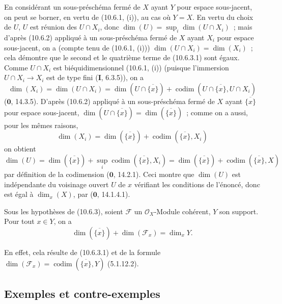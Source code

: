 En considérant un sous-préschéma fermé de $X$ ayant $Y$ pour espace sous-jacent,
on peut se borner, en vertu de (10.6.1, (i)), au cas où $Y=X$. En vertu du choix
de $U$, $U$ est réunion des $U\cap X_i$, donc
$\dim(U)=\sup_i\dim(U\cap X_i)$~; mais d'après (10.6.2) appliqué à un
sous-préschéma fermé de $X$ ayant $X_i$ pour espace sous-jacent, on a (compte
tenu de (10.6.1, (i))) $\dim(U\cap X_i)=\dim(X_i)$~; cela démontre que le second
et le quatrième terme de (10.6.3.1) sont égaux. Comme $U\cap X_i$ est
biéquidimensionnel (10.6.1, (i)) (puisque l'immersion $U\cap X_i\to X_i$ est de
type fini (\textbf{I}, 6.3.5)), on a
\begin{equation}
\label{IV.10.6.3.2-fr}
\tag{10.6.3.2}
\dim(X_i)=\dim(U\cap X_i)=\dim(U\cap\overline{\{x\}})
 +\operatorname{codim}(U\cap\overline{\{x\}},U\cap X_i)
\end{equation}
($\mathbf 0$, 14.3.5). D'après (10.6.2) appliqué à un sous-préschéma fermé de
$X$ ayant $\overline{\{x\}}$ pour espace sous-jacent,
$\dim(U\cap\overline{\{x\}})=\dim(\overline{\{x\}})$~; comme on a aussi, pour les
mêmes raisons,
\begin{equation}
\label{IV.10.6.3.3-fr}
\tag{10.6.3.3}
\dim(X_i)=\dim(\overline{\{x\}})
 +\operatorname{codim}(\overline{\{x\}},X_i)
\end{equation}
on obtient
\[
  \dim(U)=\dim(\overline{\{x\}})
  +\sup_i\operatorname{codim}(\overline{\{x\}},X_i)
  =\dim(\overline{\{x\}})+\operatorname{codim}(\overline{\{x\}},X)
\]
par définition de la codimension ($\mathbf 0$, 14.2.1). Ceci montre que $\dim(U)$
est indépendante du voisinage ouvert $U$ de $x$ vérifiant les conditions de
l'énoncé, donc est égal à $\dim_x(X)$, par ($\mathbf 0$, 14.1.4.1).

\begin{corollary}[10.6.4]
\label{IV.10.6.4-fr}
Sous les hypothèses de (10.6.3), soient $\mathcal F$ un $\mathcal O_X$-Module cohérent,
$Y$ son support. Pour tout $x\in Y$, on a
\begin{equation}
\label{IV.10.6.4.1-fr}
\tag{10.6.4.1}
\dim(\overline{\{x\}})+\dim(\mathcal F_x)=\dim_xY.
\end{equation}
\end{corollary}

En effet, cela résulte de (10.6.3.1) et de la formule
$\dim(\mathcal F_x)=\operatorname{codim}(\overline{\{x\}},Y)$ (5.1.12.2).

\subsection{Exemples et contre-exemples}
\label{subsection:IV.10.7-fr}

